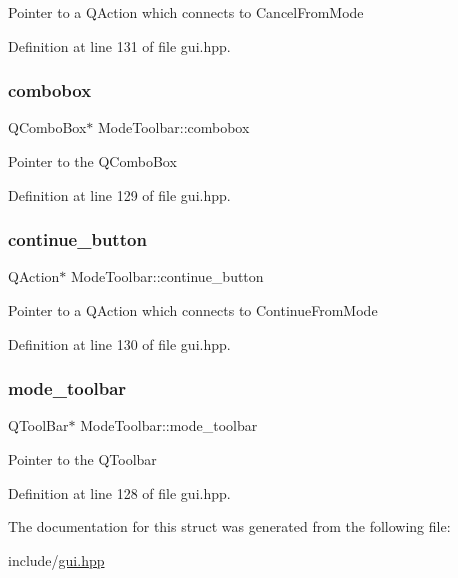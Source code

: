Pointer to a Q\+Action which connects to Cancel\+From\+Mode 

Definition at line 131 of file gui.\+hpp.

\mbox{\label{structModeToolbar_ad0ba4f03ef2a44e2543add404a50b4f1}} 
\subsubsection{\texorpdfstring{combobox}{combobox}}
{\footnotesize\ttfamily Q\+Combo\+Box$\ast$ Mode\+Toolbar\+::combobox}

Pointer to the Q\+Combo\+Box 

Definition at line 129 of file gui.\+hpp.

\mbox{\label{structModeToolbar_af7d7766f5b1710abb382c42689e963ca}} 
\subsubsection{\texorpdfstring{continue\+\_\+button}{continue\_button}}
{\footnotesize\ttfamily Q\+Action$\ast$ Mode\+Toolbar\+::continue\+\_\+button}

Pointer to a Q\+Action which connects to Continue\+From\+Mode 

Definition at line 130 of file gui.\+hpp.

\mbox{\label{structModeToolbar_acc6bcdd91825343f34ec38d312418234}} 
\subsubsection{\texorpdfstring{mode\+\_\+toolbar}{mode\_toolbar}}
{\footnotesize\ttfamily Q\+Tool\+Bar$\ast$ Mode\+Toolbar\+::mode\+\_\+toolbar}

Pointer to the Q\+Toolbar 

Definition at line 128 of file gui.\+hpp.



The documentation for this struct was generated from the following file\+:\begin{DoxyCompactItemize}
\item 
include/\mbox{\hyperlink{gui_8hpp}{gui.\+hpp}}\end{DoxyCompactItemize}
